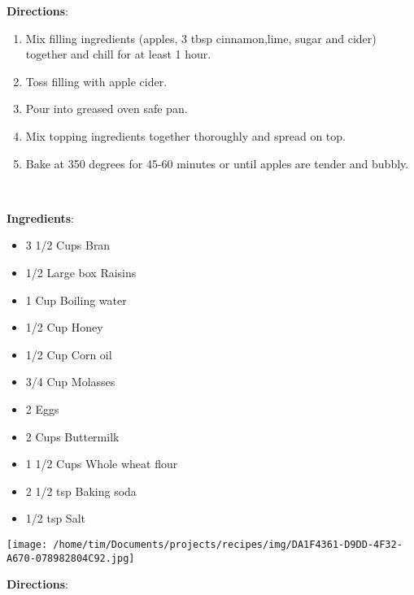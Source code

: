 \documentclass[11pt, twoside, openany]{book}
\begin{document}
\textbf{Directions}:
\vspace{-3mm}\begin{enumerate}\setlength\itemsep{-1mm}
\item Mix filling ingredients (apples, 3 tbsp cinnamon,lime, sugar and cider) together and chill for at least 1 hour.
\item Toss filling with apple cider.
\item Pour into greased oven safe pan.
\item Mix topping ingredients together thoroughly and spread on top.
\item Bake at 350 degrees for 45-60 minutes or until apples are tender and bubbly.
\end{enumerate}
 \label{bran-muffins}\hfill\textit{}\\
\begin{minipage}[t]{0.8\linewidth}
\textbf{Ingredients}:\vspace{-3mm}
\begin{multicols}{2}
\begin{itemize}\setlength\itemsep{-1mm}
\item 3 1/2 Cups Bran
\item 1/2 Large box Raisins
\item 1 Cup Boiling water
\item 1/2 Cup Honey
\item 1/2 Cup Corn oil
\item 3/4 Cup Molasses
\item 2 Eggs
\item 2 Cups Buttermilk
\item 1 1/2 Cups Whole wheat flour
\item 2 1/2 tsp Baking soda
\item 1/2 tsp Salt
\end{itemize}
\end{multicols}
\end{minipage}
\begin{minipage}[t]{0.2\linewidth}
\centering \strut\vspace*{-\baselineskip}\newline
\texttt{[image: /home/tim/Documents/projects/recipes/img/DA1F4361-D9DD-4F32-A670-078982804C92.jpg]}\\
\end{minipage}\vspace{3mm}
\textbf{Directions}:
\end{document}
